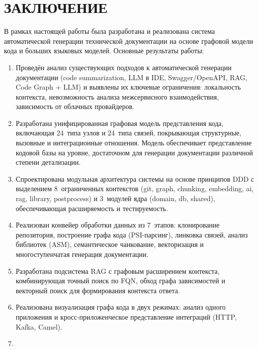 
\section*{ЗАКЛЮЧЕНИЕ}

В рамках настоящей работы была разработана и реализована система автоматической генерации технической документации на основе графовой модели кода и больших языковых моделей. Основные результаты работы:

\begin{enumerate}
  \item Проведён анализ существующих подходов к автоматической генерации документации (code summarization, LLM в IDE, Swagger/OpenAPI, RAG, Code Graph + LLM) и выявлены их ключевые ограничения: локальность контекста, невозможность анализа межсервисного взаимодействия, зависимость от облачных провайдеров.

  \item Разработана унифицированная графовая модель представления кода, включающая 24~типа узлов и 24~типа связей, покрывающая структурные, вызовные и интеграционные отношения. Модель обеспечивает представление кодовой базы на уровне, достаточном для генерации документации различной степени детализации.

  \item Спроектирована модульная архитектура системы на основе принципов DDD с выделением 8~ограниченных контекстов (git, graph, chunking, embedding, ai, rag, library, postprocess) и 3~модулей ядра (domain, db, shared), обеспечивающая расширяемость и тестируемость.

  \item Реализован конвейер обработки данных из 7~этапов: клонирование репозитория, построение графа кода (PSI-парсинг), линковка связей, анализ библиотек (ASM), семантическое чанкование, векторизация и многоступенчатая генерация документации.

  \item Разработана подсистема RAG с графовым расширением контекста, комбинирующая точный поиск по FQN, обход графа зависимостей и векторный поиск для формирования контекста ответа.

  \item Реализована визуализация графа кода в двух режимах: анализ одного приложения и кросс-приложенческое представление интеграций (HTTP, Kafka, Camel).

  \item {}
\end{enumerate}

